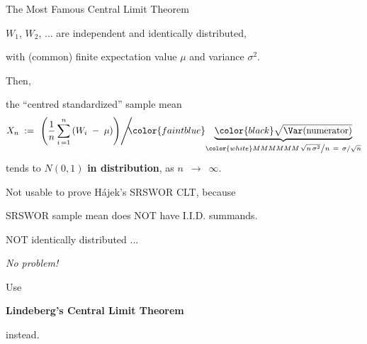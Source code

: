 \begin{frame}{\LARGE The Most Famous Central Limit Theorem}

$W_{1}$, \;$W_{2}$, \;$\ldots$\; are independent and identically distributed,

with (common) finite expectation value $\mu$ and variance $\sigma^{2}$.

\vskip 0.2cm
Then,
\large
\begin{center}
the ``centred standardized'' sample mean
\begin{equation*}
	X_{n} \;:=\;
	\left.
		\left(\dfrac{1}{n}\,\overset{n}{\underset{i\,=1}{\sum}}\,(W_{i}\;-\;\mu)\right)
	\right\slash\!\!\!\!
	{\color{faintblue}\underset{{\color{white}MMMMMM}\left.\sqrt{n\,\sigma^{2}}\right\slash n \;\,=\;\, \sigma/\sqrt{n}}{\underbrace{\color{black}\sqrt{\Var(\textnormal{numerator})}}}}
\end{equation*}
tends to $N(0,1)$ {\color{gcblue}\textbf{in distribution}},\; as \;$n$ \,$\longrightarrow$\, $\infty$.
\end{center}

\pause
\vskip 0.1cm
{\small\color{red}Not usable to prove H\'{a}jek's SRSWOR CLT, because
\pause
\begin{center}
\vskip -0.2cm
SRSWOR sample mean does NOT have  I.I.D. summands.
\end{center}
}

\end{frame}
\normalsize

\begin{frame}{\huge NOT identically distributed ...}

\pause
\begin{center}
\textit{\Huge No problem!}
\end{center}

\pause
{\LARGE
Use
\begin{center}
\vskip -0.2cm
\textbf{\Huge Lindeberg's
\vskip 0.2cm
Central Limit Theorem}
\end{center}
\vskip 0.2cm
instead.
}

\end{frame}
\normalsize

